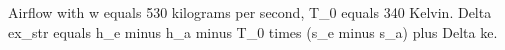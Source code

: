 Airflow with w equals 530 kilograms per second, T_0 equals 340 Kelvin.  
Delta ex_str equals h_e minus h_a minus T_0 times (s_e minus s_a) plus Delta ke.
